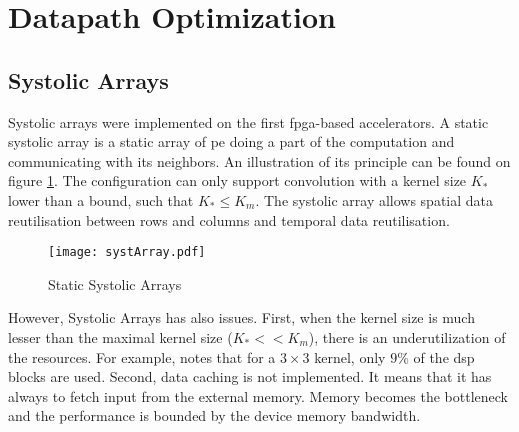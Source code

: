 \section{Datapath Optimization} \label{sec:dtptopti}
\subsection{Systolic Arrays}
Systolic arrays were implemented on the first \acrshort{fpga}-based accelerators. A static systolic array is a static array of \acrshort{pe} doing a part of the computation and communicating with its neighbors. An illustration of its principle can be found on figure \ref{fig:sytar}. The configuration can only support convolution with a kernel size $K_*$ lower than a bound, such that $K_* \leq K_m$. The systolic array allows spatial data reutilisation between rows and columns and temporal data reutilisation.\newline \newline
\begin{figure}
    \centering
    \texttt{[image: systArray.pdf]}
    \label{fig:sytar}
    \caption{Static Systolic Arrays}
\end{figure}
However, Systolic Arrays has also issues. First, when the kernel size is much lesser than the maximal kernel size ($K_* << K_m$), there is an underutilization of the resources. For example, \cite{gokhale_240_2014} notes that for a $3 \times 3$ kernel, only $9\%$ of the \acrfull{dsp} blocks are used. Second,  data caching is not implemented. It means that it has always to fetch input from the external memory. Memory becomes the bottleneck and the performance is bounded by the device memory bandwidth.
